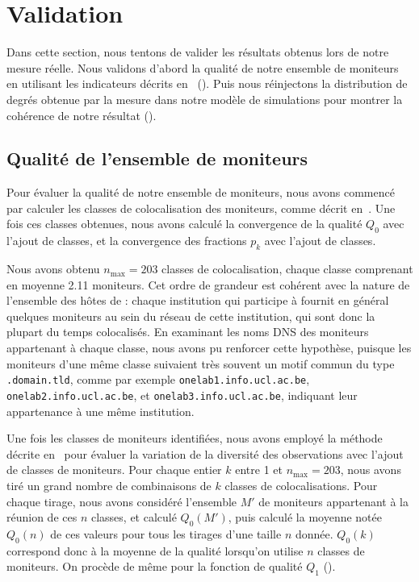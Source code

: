 \section{Validation}
\label{sec:udpping-validation}

Dans cette section, nous tentons de valider les résultats obtenus lors de notre
mesure réelle. Nous validons d'abord la qualité de notre ensemble de moniteurs
en utilisant les indicateurs décrits en~
().
Puis nous réinjectons la distribution de degrés obtenue par la mesure dans notre
modèle de simulations pour montrer la cohérence de notre résultat
().

\subsection{Qualité de l'ensemble de moniteurs}
\label{subsec:udpping-validation-monitors}

Pour évaluer la qualité de notre ensemble de moniteurs, nous avons commencé par
calculer les classes de colocalisation des moniteurs, comme décrit
en~. Une fois ces classes obtenues, nous avons
calculé la convergence de la qualité $Q_0$ avec l'ajout de classes, et la
convergence des fractions $p_k$ avec l'ajout de classes.

Nous avons obtenu $n_{\max} = 203$ classes de colocalisation, chaque classe
comprenant en moyenne 2.11 moniteurs. Cet ordre de grandeur est cohérent avec la nature de
l'ensemble des hôtes de \planetlab : chaque institution qui participe à
\planetlab fournit en général quelques moniteurs au sein du réseau de cette
institution, qui sont donc la plupart du temps colocalisés. En examinant les
noms DNS des moniteurs appartenant à chaque classe, nous avons pu renforcer
cette hypothèse, puisque les moniteurs d'une même classe suivaient très souvent
un motif commun du type {\tt*.domain.tld}, comme par exemple
\texttt{onelab1.info.ucl.ac.be}, \texttt{onelab2.info.ucl.ac.be}, et
\texttt{onelab3.info.ucl.ac.be}, indiquant leur appartenance à une même
institution.

Une fois les classes de moniteurs identifiées, nous avons employé la méthode
décrite en~ pour évaluer la variation de
la diversité des observations avec l'ajout de classes de moniteurs. Pour chaque
entier $k$ entre 1 et $n_{\max} = 203$, nous avons tiré un grand nombre de
combinaisons de $k$ classes de colocalisations. Pour chaque tirage, nous avons considéré
l'ensemble $M'$ de moniteurs appartenant à la réunion de ces $n$ classes, et
calculé $Q_0(M')$, puis calculé la moyenne notée $Q_0(n)$ de ces valeurs pour
tous les tirages d'une taille $n$ donnée. $Q_0(k)$ correspond donc à la moyenne
de la qualité lorsqu'on utilise $n$ classes de moniteurs. On procède de même pour
la fonction de qualité $Q_1$ ().

